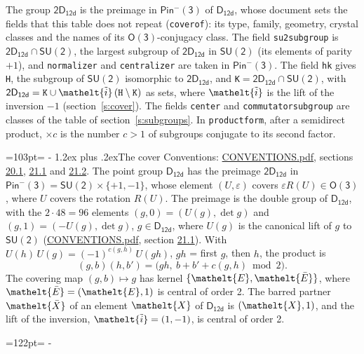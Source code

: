 \documentclass[10pt,a4paper]{article}
\makeatletter
\renewcommand\section{\@startsection{section}{1}{\z@}{-3ex plus -1ex minus -.2ex}%
  {1.2ex plus .2ex}{\normalfont\large\sffamily\bfseries\color{parttitle}}}
\newcommand{\needspace}[1]{\par\penalty-100\begingroup\dimen0=#1\relax\dimen2=\pagegoal
  \advance\dimen2-\pagetotal\ifdim\dimen0>\dimen2\relax\ifdim\dimen2>0pt\vfil\break\fi\fi
  \endgroup}
\numberwithin{equation}{section}
\newcommand{\eltfont}[1]{{\let\sigma\eltsigma\mathelt{#1}}}
\newcommand{\grp}[1]{\mathsf{#1}}
\newcommand{\elt}[1]{\eltfont{#1}}
\newcommand{\dirprod}{\times}
\newcommand{\barred}[1]{\bar{#1}}
\newcommand{\lift}[1]{\tilde{#1}}
\makeatother
\begin{document}
\leavevmode\label{n:element.inversion}\label{n:group.preimage}The group $\grp{2D_{12d}}$ is the preimage in $\grp{Pin^{-}(3)}$ of \href{../../../rotation/data/pdf/D12d.pdf}{$\grp{D_{12d}}$}, whose document sets the fields that this table does not repeat (\texttt{coverof}): its type, family, geometry, crystal classes and the names of its \href{../../../rotation/data/pdf/O3.pdf}{$\grp{O(3)}$}-conjugacy class. The field \texttt{su2subgroup} is $\grp{2D_{12d}} \cap \grp{SU(2)}$, the largest subgroup of $\grp{2D_{12d}}$ in $\grp{SU(2)}$ (its elements of parity $+1$), and \texttt{normalizer} and \texttt{centralizer} are taken in $\grp{Pin^{-}(3)}$. The field \texttt{hk} gives \texttt{H}, the subgroup of $\grp{SU(2)}$ isomorphic to $\grp{2D_{12d}}$, and \texttt{K}${} = \grp{2D_{12d}} \cap \grp{SU(2)}$, with $\grp{2D_{12d}} = \texttt{K} \cup \elt{\lift{i}}\,(\texttt{H} \setminus \texttt{K})$ as sets, where $\elt{\lift{i}}$ is the lift of the inversion $-1$ (section~\ref{s:cover}). The fields \texttt{center} and \texttt{commutatorsubgroup} are classes of the table of section~\ref{s:subgroups}.
\leavevmode\label{n:index.conjugates.c}In \texttt{productform}, after a semidirect product, ${\times}c$ is the number $c > 1$ of subgroups conjugate to its second factor.
\needspace{103pt}
\section{The cover}\label{s:cover}
Conventions: \href{../../CONVENTIONS.pdf}{CONVENTIONS.pdf}, sections \href{../../CONVENTIONS.pdf\#conv.20.1}{20.1}, \href{../../CONVENTIONS.pdf\#conv.21.1}{21.1} and \href{../../CONVENTIONS.pdf\#conv.21.2}{21.2}.
\leavevmode\label{n:group.pin.minus}\label{n:group.su2}\label{n:local.pin.sign}\label{n:matrix.covered}\label{n:matrix.lift.su2}\label{n:index.bar}The point group $\grp{D_{12d}}$ has the preimage $\grp{2D_{12d}}$ in $\grp{Pin^{-}(3)} = \grp{SU(2)} \dirprod \{+1, -1\}$, whose element $(U, \varepsilon)$ covers $\varepsilon R(U) \in \grp{O(3)}$, where $U$ covers the rotation $R(U)$. The preimage is the double group of $\grp{D_{12d}}$, with the $2 \cdot 48 = 96$ elements $(g, 0) = (U(g), \det g)$ and $(g, 1) = (-U(g), \det g)$, $g \in \grp{D_{12d}}$, where $U(g)$ is the canonical lift of $g$ to $\grp{SU(2)}$ (\href{../../CONVENTIONS.pdf}{CONVENTIONS.pdf}, section \href{../../CONVENTIONS.pdf\#conv.21.1}{21.1}). \label{n:function.cocycle}With $U(h)\,U(g) = (-1)^{c(g,h)}\,U(gh)$, $gh$ = first $g$, then $h$, the product is
\begin{equation}\label{e:product}(g, b)(h, b') = \bigl(gh,\ b + b' + c(g, h) \bmod 2\bigr).\end{equation}
\leavevmode\label{n:mark.bar}The covering map $(g, b) \mapsto g$ has kernel $\{\elt{E}, \elt{\barred{E}}\}$, where $\elt{\barred{E}} = (\elt{E}, 1)$ is central of order 2. \label{n:element.named}\label{n:mark.lift}The barred partner $\elt{\barred{X}}$ of an element $\elt{X}$ of $\grp{D_{12d}}$ is $(\elt{X}, 1)$, and the lift of the inversion, $\elt{\lift{i}} = (1, -1)$, is central of order 2.
\needspace{122pt}
\end{document}
